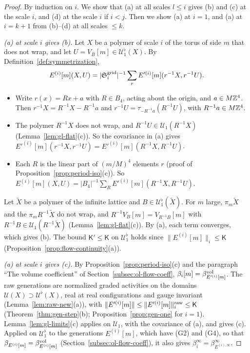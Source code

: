 \begin{proof}
By induction on $i$. We show that (a) at all scales $l\le i$ gives (b) and (c) at the scale $i$, and (d) at the scale $i$ if $i<j$. Then we show (a) at $i=1$, and (a) at $i=k+1$ from (b)--(d) at all scales $\le k$.

\emph{(a) at scale $i$ gives (b).} Let $X$ be a polymer of scale $i$ of the torus of side $m$ that does not wrap, and let $U=V_B[m]\in\mathcal U^\flat_1(X)$. By Definition~\ref{def:symmetrization},
\[
E^{(i)}[m](X,U)=|\mathfrak S^{\rm grid}_i|^{-1}\sum_rE'^{(i)}[m](r^{-1}X,r^{-1}U).
\]
\begin{itemize}
\item Write $r(x)=Rx+a$ with $R\in B_4$, acting about the origin, and $a\in M\mathbb Z^4$. Then $r^{-1}X=R^{-1}X-R^{-1}a$ and $r^{-1}U=\tau_{-R^{-1}a}(R^{-1}U)$, with $R^{-1}a\in M\mathbb Z^4$.
\item The polymer $R^{-1}X$ does not wrap, and $R^{-1}U\in\mathcal U_1(R^{-1}X)$ (Lemma~\ref{lem:gl-flat}(c)). So the covariance in (a) gives $E'^{(i)}[m](r^{-1}X,r^{-1}U)=E'^{(i)}[m](R^{-1}X,R^{-1}U)$.
\item Each $R$ is the linear part of $(m/M)^4$ elements $r$ (proof of Proposition~\ref{prop:period-iso}(c)). So $E^{(i)}[m](X,U)=|B_4|^{-1}\sum_RE'^{(i)}[m](R^{-1}X,R^{-1}U)$.
\end{itemize}
Let $\tilde X$ be a polymer of the infinite lattice and $B\in\mathcal U^\flat_1(\tilde X)$. For $m$ large, $\pi_m\tilde X$ and the $\pi_mR^{-1}\tilde X$ do not wrap, and $R^{-1}V_B[m]=V_{R^{-1}B}[m]$ with $R^{-1}B\in\mathcal U_1(R^{-1}\tilde X)$ (Lemma~\ref{lem:gl-flat}(c)). By (a), each term converges, which gives (b). The bound $\mathsf K'\le\mathsf K$ on $\mathcal U^\flat_1$ holds since $\|E^{(i)}[m]\|_i\le\mathsf K$ (Proposition~\ref{prop:flow-continuity}(a)).

\emph{(a) at scale $i$ gives (c).} By Proposition~\ref{prop:period-iso}(c) and the paragraph ``The volume coefficient'' of Section~\ref{subsec:ol-flow-coeff}, $\beta_i[m]=\beta^{\rm vol}_{E'^{(i)}[m]}$. The raw generations are normalized graded activities on the domains $\mathcal U(X)\supset\mathcal U^\flat(X)$, real at real configurations and gauge invariant (Lemma~\ref{lem:raw-new}(a)), with $\|E'^{(i)}[m]\|\le\|E'^{(i)}[m]\|^{\rm raw}_i\le\mathsf K$ (Theorem~\ref{thm:gen-step}(b); Proposition~\ref{prop:gen-one} for $i=1$). Lemma~\ref{lem:gl-limits}(c) applies on $\mathcal U_1$, with the covariance of (a), and gives (c). Applied on $\mathcal U^\flat_1$ to the generations $E^{(i)}[m]$, which have (G2) and (G4), so that $\beta_{E^{(i)}[m]}=\beta^{\rm vol}_{E^{(i)}[m]}$ (Section~\ref{subsec:ol-flow-coeff}), it also gives $\beta^\infty_i=\beta^\infty_{E^{(i),\infty}}$.


\end{proof}
